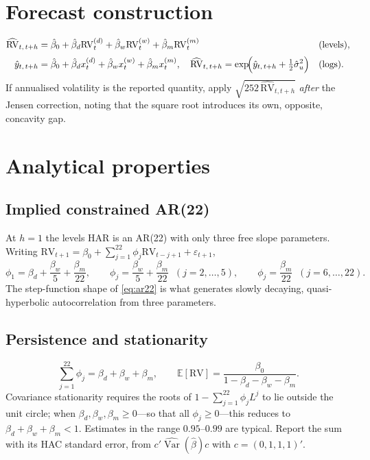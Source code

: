 \documentclass[11pt,a4paper]{article}
\newcommand{\RV}{\mathrm{RV}}
\newcommand{\E}{\mathbb{E}}
\newcommand{\Var}{\operatorname{Var}}
\begin{document}
\section{Forecast construction}
\label{sec:forecast}

\begin{align}
  \widehat{\RV}_{t,\,t+h}
  &=\hat\beta_{0}+\hat\beta_{d}\RV^{(d)}_{t}+\hat\beta_{w}\RV^{(w)}_{t}+\hat\beta_{m}\RV^{(m)}_{t}
  && \text{(levels)}, \label{eq:fc-raw}\\[2pt]
  \hat y_{t,\,t+h}
  &=\hat\beta_{0}+\hat\beta_{d}x^{(d)}_{t}+\hat\beta_{w}x^{(w)}_{t}+\hat\beta_{m}x^{(m)}_{t},
  \quad
  \widehat{\RV}_{t,\,t+h}=\exp\!\Bigl(\hat y_{t,\,t+h}+\tfrac{1}{2}\hat\sigma_u^{2}\Bigr)
  && \text{(logs)}. \label{eq:fc-log}
\end{align}
If annualised volatility is the reported quantity, apply
$\sqrt{252\,\widehat{\RV}_{t,t+h}}$ \emph{after} the Jensen correction, noting that the
square root introduces its own, opposite, concavity gap.

\section{Analytical properties}
\label{sec:properties}

\subsection{Implied constrained AR(22)}

At $h=1$ the levels HAR is an AR(22) with only three free slope parameters. Writing
$\RV_{t+1}=\beta_0+\sum_{j=1}^{22}\phi_j\RV_{t-j+1}+\varepsilon_{t+1}$,
\begin{equation}
  \phi_1=\beta_d+\frac{\beta_w}{5}+\frac{\beta_m}{22},
  \qquad
  \phi_j=\frac{\beta_w}{5}+\frac{\beta_m}{22}\;\;(j=2,\dots,5),
  \qquad
  \phi_j=\frac{\beta_m}{22}\;\;(j=6,\dots,22).
  \label{eq:ar22}
\end{equation}
The step-function shape of \eqref{eq:ar22} is what generates slowly decaying,
quasi-hyperbolic autocorrelation from three parameters.

\subsection{Persistence and stationarity}

\begin{equation}
  \sum_{j=1}^{22}\phi_j=\beta_d+\beta_w+\beta_m,
  \qquad
  \E[\RV]=\frac{\beta_0}{1-\beta_d-\beta_w-\beta_m}.
  \label{eq:persistence}
\end{equation}
Covariance stationarity requires the roots of $1-\sum_{j=1}^{22}\phi_jL^{j}$ to lie outside
the unit circle; when $\beta_d,\beta_w,\beta_m\ge0$---so that all $\phi_j\ge0$---this reduces
to $\beta_d+\beta_w+\beta_m<1$. Estimates in the range $0.95$--$0.99$ are typical. Report the
sum with its HAC standard error, from $c'\widehat{\Var}(\hat\beta)c$ with $c=(0,1,1,1)'$.
\end{document}

